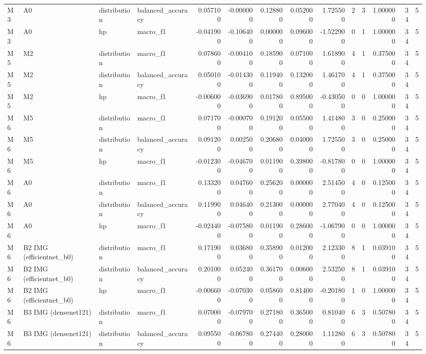 \begin{table}
\begin{tabular}{llllrrrrrrrrrr}
M3 & A0 & distribution & balanced\_accuracy & 0.057100 & -0.000000 & 0.128800 & 0.052000 & 1.725500 & 2 & 3 & 1.000000 & 34 & 5 \\
M3 & A0 & hp & macro\_f1 & -0.041900 & -0.106400 & 0.000000 & 0.096000 & -1.522900 & 0 & 1 & 1.000000 & 34 & 5 \\
M5 & M2 & distribution & macro\_f1 & 0.078600 & -0.004100 & 0.185900 & 0.071000 & 1.618900 & 4 & 1 & 0.375000 & 34 & 5 \\
M5 & M2 & distribution & balanced\_accuracy & 0.050100 & -0.014300 & 0.119400 & 0.132000 & 1.461700 & 4 & 1 & 0.375000 & 34 & 5 \\
M5 & M2 & hp & macro\_f1 & -0.006000 & -0.036900 & 0.017800 & 0.895000 & -0.430500 & 0 & 0 & 1.000000 & 34 & 5 \\
M6 & M5 & distribution & macro\_f1 & 0.071700 & -0.000700 & 0.191200 & 0.055000 & 1.414800 & 3 & 0 & 0.250000 & 34 & 5 \\
M6 & M5 & distribution & balanced\_accuracy & 0.091200 & 0.002500 & 0.206800 & 0.040000 & 1.725500 & 3 & 0 & 0.250000 & 34 & 5 \\
M6 & M5 & hp & macro\_f1 & -0.012300 & -0.046700 & 0.011900 & 0.398000 & -0.817800 & 0 & 0 & 1.000000 & 34 & 5 \\
M6 & A0 & distribution & macro\_f1 & 0.133200 & 0.047600 & 0.256200 & 0.000000 & 2.514500 & 4 & 0 & 0.125000 & 34 & 5 \\
M6 & A0 & distribution & balanced\_accuracy & 0.119900 & 0.046400 & 0.213000 & 0.000000 & 2.770400 & 4 & 0 & 0.125000 & 34 & 5 \\
M6 & A0 & hp & macro\_f1 & -0.024400 & -0.075800 & 0.011900 & 0.286000 & -1.067900 & 0 & 0 & 1.000000 & 34 & 5 \\
M6 & B2 IMG (efficientnet\_b0) & distribution & macro\_f1 & 0.171900 & 0.036800 & 0.358900 & 0.012000 & 2.123300 & 8 & 1 & 0.039100 & 34 & 5 \\
M6 & B2 IMG (efficientnet\_b0) & distribution & balanced\_accuracy & 0.201000 & 0.052400 & 0.361700 & 0.006000 & 2.532500 & 8 & 1 & 0.039100 & 34 & 5 \\
M6 & B2 IMG (efficientnet\_b0) & hp & macro\_f1 & -0.006600 & -0.070300 & 0.058600 & 0.814000 & -0.201800 & 1 & 0 & 1.000000 & 34 & 5 \\
M6 & B3 IMG (densenet121) & distribution & macro\_f1 & 0.070000 & -0.079700 & 0.271800 & 0.365000 & 0.810400 & 6 & 3 & 0.507800 & 34 & 5 \\
M6 & B3 IMG (densenet121) & distribution & balanced\_accuracy & 0.095500 & -0.067800 & 0.274400 & 0.280000 & 1.112800 & 6 & 3 & 0.507800 & 34 & 5 \\

\end{tabular}
\end{table}
